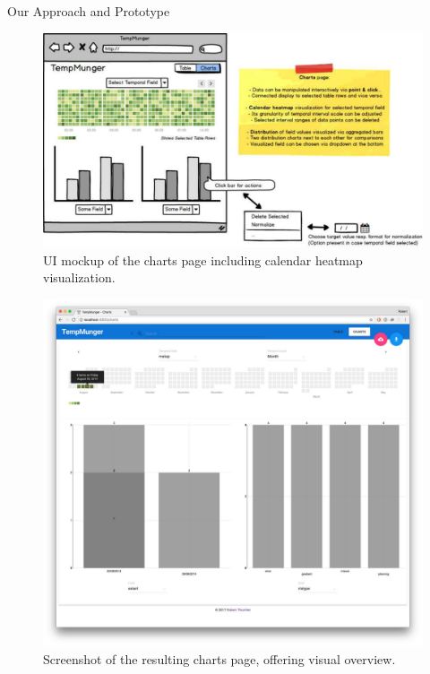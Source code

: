 \documentclass[final,hyperref={pdfpagelabels=true}]{beamer}
\begin{document}
\begin{frame}
\begin{columns}[t]
    \begin{column}{.45\textwidth}
      \begin{block}{Our Approach and Prototype}
        \begin{figure}[h]
          \centering
          \includegraphics[width=1.0\textwidth]{../thesis/figures/design/mockup-6_cmyk}
          \caption{UI mockup of the charts page including calendar heatmap visualization.}
          \label{fig:mockup-6}
        \end{figure}

        \begin{figure}[h]
          \centering
          \includegraphics[width=1.0\textwidth]{../thesis/figures/implementation/screenshot-charts-page_cmyk}
          \caption{Screenshot of the resulting charts page, offering visual overview.}
          \label{fig:screenshot-charts-page}
        \end{figure}
      \end{block}


\end{column}
\end{columns}
\end{frame}
\end{document}

